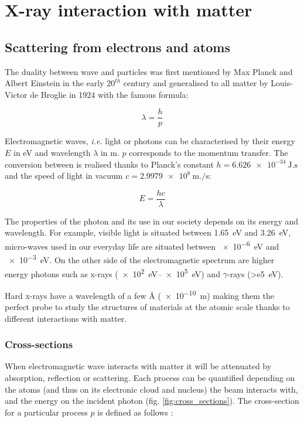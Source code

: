 \section{X-ray interaction with matter} \label{sec:XRIntMatter}

\subsection{Scattering from electrons and atoms}

The duality between wave and particles was first mentioned by Max Planck and Albert Einstein in the early $20^{th}$ century and generalised to all matter by Louis-Victor de Broglie in 1924 with the famous formula:

\begin{equation}
	\lambda = \frac{h}{p}
\end{equation}

Electromagnetic waves, \textit{i.e.} light or photons can be characterised by their energy $E$ in \unit{\eV} and wavelength $\lambda$ in \unit{\meter}. $p$ corresponds to the momentum transfer.
The conversion between is realised thanks to Planck's constant $h = \qty{6.626e-34}{\joule.\second}$ and the speed of light in vacuum $c = \qty{2.9979e8}{\meter.\per \second}$:

\begin{equation}
    \label{eq:EnergyLambda}
	E = \frac{hc}{\lambda}
\end{equation}

The properties of the photon and its use in our society depends on its energy and wavelength.
For example, visible light is situated between \qty{1.65}{\eV} and \qty{3.26}{\eV}, micro-waves used in our everyday life are situated between \qty{e-6}{\eV} and \qty{e-3}{\eV}.
On the other side of the electromagnetic spectrum are higher energy photons such as x-rays (\qtyrange{e2}{e5}{\eV}) and $\gamma$-rays (\qty{>e5}{\eV}).

Hard x-rays have a wavelength of a few \unit{\angstrom} (\qty{e-10}{\m}) making them the perfect probe to study the structures of materials at the atomic scale thanks to different interactions with matter.

\subsubsection{Cross-sections}

When electromagnetic wave interacts with matter it will be attenuated by absorption, reflection or scattering.
Each process can be quantified depending on the atoms (and thus on its electronic cloud and nucleus) the beam interacts with, and the energy on the incident photon (fig. \ref{fig:cross_sections}).
The cross-section for a particular process $p$ is defined as follows \parencite{Willmott}:

